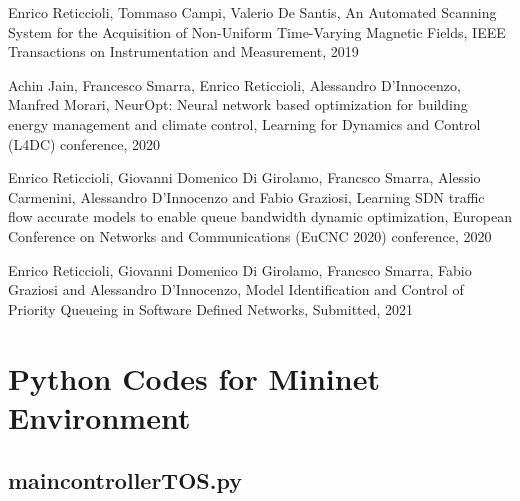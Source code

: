 \documentclass[12pt, a4paper, twoside, openright]{ociamthesis}  %
\begin{document}



\renewcommand{\bibname}{References}

\renewcommand{\bibname}{Publications}

\begin{thebibliography}{4}
 Enrico Reticcioli, Tommaso Campi, Valerio De Santis, An Automated Scanning System for the Acquisition of Non-Uniform Time-Varying Magnetic Fields, IEEE Transactions on Instrumentation and Measurement, 2019

Achin Jain, Francesco Smarra, Enrico Reticcioli, Alessandro D'Innocenzo, Manfred Morari, NeurOpt: Neural network based optimization for building energy management and climate control, Learning for Dynamics and Control (L4DC) conference, 2020

Enrico Reticcioli, Giovanni Domenico Di Girolamo, Francsco Smarra, Alessio Carmenini, Alessandro D’Innocenzo and Fabio Graziosi, Learning SDN traffic flow accurate models to enable queue bandwidth dynamic optimization, European Conference on Networks and Communications (EuCNC 2020) conference, 2020

Enrico Reticcioli, Giovanni Domenico Di Girolamo, Francsco Smarra, Fabio Graziosi and Alessandro D’Innocenzo, Model Identification and Control of Priority Queueing in Software Defined Networks, Submitted, 2021
\end{thebibliography}
%

\appendix
\lstset{firstnumber=1}
\chapter{Python Codes for Mininet Environment}\label{Py_codes}
\section{main\textunderscore controller\textunderscore TOS.py}\label{main_controller_TOS}

\end{document}
